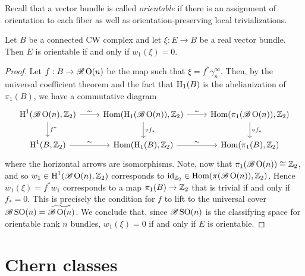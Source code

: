 \documentclass{amsart}
\begin{document}
Recall that a vector bundle is called \textit{orientable} if there is an assignment
of orientation to each fiber as well as orientation-preserving local trivializations.
\begin{proposition}
    Let $B$ be a connected CW complex and let $\xi:E\to B$ be a real vector bundle.
    Then $E$ is orientable if and only if $w_1(\xi)=0$.
\end{proposition}
\begin{proof}
    Let $f:B\to\mathscr{B}\operatorname{O}(n)$ be the map such that $\xi=f^*\gamma_n^\infty$.
    Then, by the universal coefficient theorem and the fact that $\operatorname{H}_1(B)$ is the abelianization
    of $\pi_1(B)$, we have a commutative diagram
    \begin{equation*}
        \begin{tikzcd}
            \HH^1(\mathscr{B}\OO(n),\Z_2)\ar{r}{\sim}\ar{d}{f^*} & \Hom(\HH_1(\mathscr{B}\OO(n)),\Z_2)\ar{r}{\sim}\ar{d}{\circ f_*} & \Hom(\pi_1(\mathscr{B}\OO(n)),\Z_2)\ar{d}{\circ f_*}\\
            \HH^1(B,\Z_2)\ar{r}{\sim} & \Hom(\HH_1(B),\Z_2)\ar{r}{\sim} & \Hom(\pi_1(B),\Z_2)
        \end{tikzcd}
    \end{equation*}
    where the horizontal arrows are isomorphisms. Note, now that $\pi_1(\mathscr{B}\operatorname{O}(n))\cong\mathbb{Z}_2$,
    and so $w_1\in\operatorname{H}^1(\mathscr{B}\operatorname{O}(n),\mathbb{Z}_2)$ corresponds to $\operatorname{id}_{\mathbb{Z}_2}\in\operatorname{Hom}(\pi(\mathscr{B}\operatorname{O}(n)),\mathbb{Z}_2)$.
    Hence $w_1(\xi)=f^*w_1$ corresponds to a map $\pi_1(B)\to\mathbb{Z}_2$ that is trivial if and only if
    $f_*=0$. This is precisely the condition for $f$ to lift to the universal cover
    $\mathscr{B}\operatorname{SO}(n)=\widetilde{\mathscr{B}\operatorname{O}(n)}$. We conclude that, since $\mathscr{B}\operatorname{SO}(n)$ is the
    classifying space for orientable rank $n$ bundles, $w_1(\xi)=0$ if and only if $E$ is orientable.
\end{proof}

\section{Chern classes}
\end{document}
